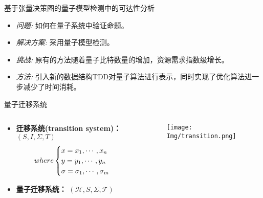 \documentclass[aspectratio=1610]{ctexbeamer}
\begin{document}
\begin{frame}{基于张量决策图的量子模型检测中的可达性分析}
    \begin{itemize}
            \setlength\itemsep{1em} %
            \item \textit{问题:} 如何在量子系统中验证命题。
            \item \textit{解决方案:} 采用量子模型检测。
            \item \textit{挑战:} 原有的方法随着量子比特数量的增加，资源需求指数级增长。
            \item \textit{方法:} 引入新的数据结构TDD对量子算法进行表示，同时实现了优化算法进一步减少了时间消耗。
    \end{itemize}
\end{frame}
\begin{frame}{量子迁移系统}
    \begin{columns}[T] %

        \begin{column}{.6\textwidth}
            \begin{itemize}
                \item  \textbf{迁移系统(transition system)：} $(S, I, \Sigma, T)$
                \begin{equation}
                  where
                  \begin{cases}
                    x = x_1, \cdots, x_n\\
                    y = y_1, \cdots, y_n\\
                    \sigma = \sigma_1, \cdots, \sigma_m
                  \end{cases}
                  \notag
                \end{equation}
                \item \textbf{量子迁移系统：} $(\mathcal{H},S,\Sigma,\mathcal{T})$
            \end{itemize}
        \end{column}
    
        \begin{column}{.3\textwidth}
          \begin{figure}
            \centering
            \texttt{[image: Img/transition.png]}
          \end{figure}
        \end{column}
    
      \end{columns}
\end{frame}
\end{document}
